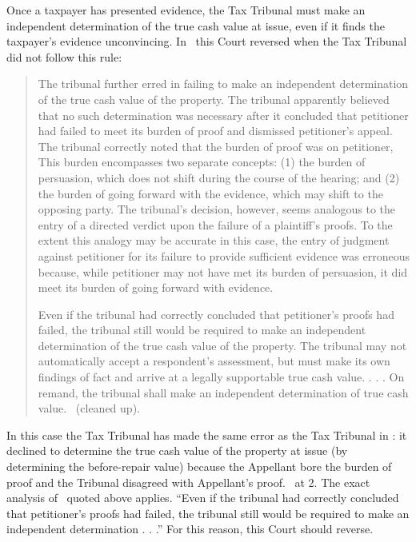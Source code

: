 \documentclass[12pt,\documentclassflag]{michiganCourtOfAppealsBrief}
\begin{document}
Once a taxpayer has presented evidence, the Tax Tribunal must make an independent determination of the true cash value at issue, even if it finds the taxpayer's evidence unconvincing. In \cite{Jones & Laughlin}\ this Court reversed when the Tax Tribunal did not follow this rule:

\begin{quotation}
	The tribunal further erred in failing to make an independent determination of the true cash value of the property. The tribunal apparently believed that no such determination was necessary after it concluded that petitioner had failed to meet its burden of proof and dismissed petitioner's appeal. The tribunal correctly noted that the burden of proof was on petitioner, This burden encompasses two separate concepts: (1) the burden of persuasion, which does not shift during the course of the hearing; and (2) the burden of going forward with the evidence, which may shift to the opposing party. The tribunal's decision, however, seems analogous to the entry of a directed verdict upon the failure of a plaintiff's proofs. To the extent this analogy may be accurate in this case, the entry of judgment against petitioner for its failure to provide sufficient evidence was erroneous because, while petitioner may not have met its burden of persuasion, it did meet its burden of going forward with evidence.
	
	Even if the tribunal had correctly concluded that petitioner's proofs had failed, the tribunal still would be required to make an independent determination of the true cash value of the property. The tribunal may not automatically accept a respondent's assessment, but must make its own findings of fact and arrive at a legally supportable true cash value. . . . On remand, the tribunal shall make an independent determination of true cash value. \ (cleaned up).
\end{quotation}

In this case the Tax Tribunal has made the same error as the Tax Tribunal in \cite[s]{Jones & Laughlin}: it declined to determine the true cash value of the property at issue (by determining the before-repair value) because the Appellant bore the burden of proof and the Tribunal disagreed with Appellant's proof. \orderDenying\ at 2. The exact analysis of \cite[s]{Jones & Laughlin}\ quoted above applies. ``Even if the tribunal had correctly concluded that petitioner's proofs had failed, the tribunal still would be required to make an independent determination . . .'' For this reason, this Court should reverse.
\end{document}
